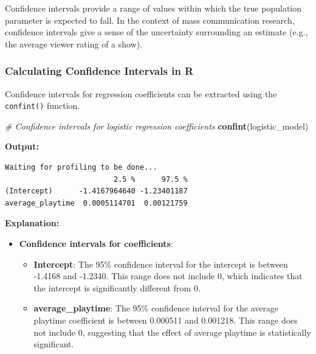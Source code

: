 \documentclass[
]{book}
\newenvironment{Shaded}{\begin{snugshade}}{\end{snugshade}}
\newcommand{\CommentTok}[1]{\textcolor[rgb]{0.56,0.35,0.01}{\textit{#1}}}
\newcommand{\FunctionTok}[1]{\textcolor[rgb]{0.13,0.29,0.53}{\textbf{#1}}}
\newcommand{\NormalTok}[1]{#1}
\providecommand{\tightlist}{%
  \setlength{\itemsep}{0pt}\setlength{\parskip}{0pt}}
\begin{document}
Confidence intervals provide a range of values within which the true population parameter is expected to fall. In the context of mass communication research, confidence intervals give a sense of the uncertainty surrounding an estimate (e.g., the average viewer rating of a show).

\subsubsection*{Calculating Confidence Intervals in R}\label{calculating-confidence-intervals-in-r}

Confidence intervals for regression coefficients can be extracted using the \texttt{confint()} function.

\begin{Shaded}
\begin{Highlighting}[]
\CommentTok{\# Confidence intervals for logistic regression coefficients}
\FunctionTok{confint}\NormalTok{(logistic\_model)}
\end{Highlighting}
\end{Shaded}

\textbf{Output:}

\begin{verbatim}
Waiting for profiling to be done...
                         2.5 %      97.5 %
(Intercept)      -1.4167964640 -1.23401187
average_playtime  0.0005114701  0.00121759
\end{verbatim}

\textbf{Explanation:}

\begin{itemize}
\tightlist
\item
  \textbf{Confidence intervals for coefficients}:

  \begin{itemize}
  \tightlist
  \item
    \textbf{Intercept}: The 95\% confidence interval for the intercept is between -1.4168 and -1.2340. This range does not include 0, which indicates that the intercept is significantly different from 0.
  \item
    \textbf{average\_playtime}: The 95\% confidence interval for the average playtime coefficient is between 0.000511 and 0.001218. This range does not include 0, suggesting that the effect of average playtime is statistically significant.
  \end{itemize}
\end{itemize}
\end{document}
